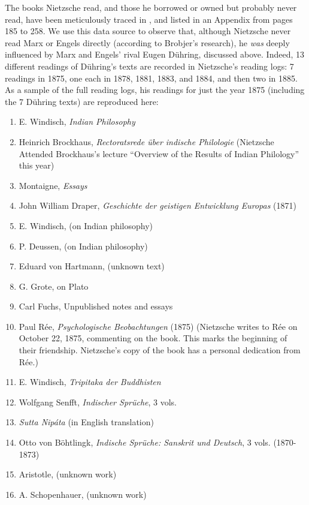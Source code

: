The books Nietzsche read, and those he borrowed or owned but probably never read, have been meticulously traced in \cite{brobjer_nietzsche_2010}, and listed in an Appendix from pages 185 to 258. We use this data source to observe that, although Nietzsche never read Marx or Engels directly (according to Brobjer's research), he \textit{was} deeply influenced by Marx and Engels' rival Eugen Dühring, discussed above. Indeed, 13 different readings of Dühring's texts are recorded in Nietzsche's reading logs: 7 readings in 1875, one each in 1878, 1881, 1883, and 1884, and then two in 1885. As a sample of the full reading logs, his readings for just the year 1875 (including the 7 Dühring texts) are reproduced here:

\begin{enumerate}
    \item E. Windisch, \textit{Indian Philosophy}
    \item Heinrich Brockhaus, \textit{Rectoratsrede über indische Philologie} (Nietzsche Attended Brockhaus's lecture ``Overview of the Results of Indian Philology'' this year)
    \item Montaigne, \textit{Essays}
    \item John William Draper, \textit{Geschichte der geistigen Entwicklung Europas} (1871)
    \item E. Windisch, (on Indian philosophy)
    \item P. Deussen, (on Indian philosophy)
    \item Eduard von Hartmann, (unknown text)
    \item G. Grote, on Plato
    \item Carl Fuchs, Unpublished notes and essays
    \item Paul Rée, \textit{Psychologische Beobachtungen} (1875) (Nietzsche writes to Rée on October 22, 1875, commenting on the book. This marks the beginning of their friendship. Nietzsche's copy of the book has a personal dedication from Rée.)
    \item E. Windisch, \textit{Tripitaka der Buddhisten}
    \item Wolfgang Senfft, \textit{Indischer Sprüche}, 3 vols.
    \item \textit{Sutta Nipáta} (in English translation)
    \item Otto von Böhtlingk, \textit{Indische Sprüche: Sanskrit und Deutsch}, 3 vols. (1870-1873)
    \item Aristotle, (unknown work)
    \item A. Schopenhauer, (unknown work)

\end{enumerate}
